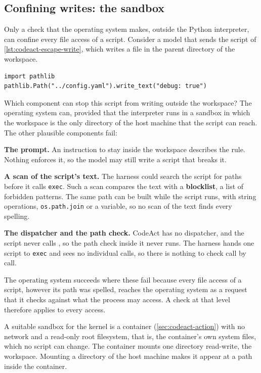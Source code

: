 \subsection{Confining writes: the sandbox}
\label{sec:codeact-sandbox}

Only a check that the operating system makes, outside the Python interpreter, can confine every
file access of a script.
Consider a model that sends the script of \cref{lst:codeact-escape-write}, which writes a file in
the parent directory of the workspace.

\begin{lstlisting}[basicstyle=\ttfamily\footnotesize, columns=fixed, basewidth=0.525em, caption={Illustrative script that writes outside the workspace.}, label=lst:codeact-escape-write]
import pathlib
pathlib.Path("../config.yaml").write_text("debug: true")
\end{lstlisting}

Which component can stop this script from writing outside the workspace? The operating system can,
provided that the interpreter runs in a sandbox in which the workspace is the only directory of the
host machine that the script can reach. The other plausible components fail:
\bi
\item \textbf{The prompt.} An instruction to stay inside the workspace describes the rule. Nothing
enforces it, so the model may still write a script that breaks it.
\item \textbf{A scan of the script's text.} The harness could search the script for paths before it
calls \texttt{exec}. Such a scan compares the text with a \textbf{blocklist}, a list of forbidden
patterns. The same
path can be built while the script runs, with string operations, \texttt{os.path.join} or a
variable, so no scan of the text finds every spelling.
\item \textbf{The dispatcher and the path check.} CodeAct has no dispatcher, and the script never
calls , so the path check inside it never runs. The harness hands one script to
\texttt{exec} and sees no individual calls, so there is nothing to check call by call.
\ei

The operating system succeeds where these fail because every file access of a script, however its
path was spelled, reaches the operating system as a request that it checks against what the
process may access. A check at that level therefore applies to every access.

A suitable sandbox for the kernel is a container (\cref{sec:codeact-action}) with no network and a
read-only root filesystem, that is, the container's own system files, which no script can change.
The container mounts one directory read-write, the workspace. Mounting a directory of the host
machine makes it appear at a path inside the container.

